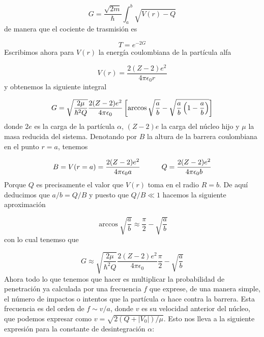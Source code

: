 \begin{equation}
    G = \frac{\sqrt{2m}}{\hbar} \int_a^b \sqrt{V(r)-Q}
\end{equation}
de manera que el cociente de trasmisión es

\begin{equation}
    T = e^{-2G}
\end{equation}
Escribimos ahora para $V(r)$ la energía coulombiana de la partícula alfa 

\begin{equation}
    V(r) = \frac{2(Z-2)e^2}{4\pi \epsilon_0 r}
\end{equation}
y obtenemos la siguiente integral

\begin{equation}
    G = \sqrt{\frac{2\mu}{\hbar^2Q}} \frac{2(Z-2)e^2}{4 \pi \epsilon_0} \left[ \arccos \sqrt{\frac{a}{b}}- \sqrt{\frac{a}{b}\left( 1-\frac{a}{b} \right)} \right]
\end{equation}
donde $2e$ es la carga de la partícula $\alpha$, $(Z-2)e$ la carga del núcleo hijo y $\mu$ la masa reducida del sistema. Denotando por $B$ la altura de la barrera coulombiana en el punto $r=a$, tenemos 

\begin{equation}
    B= V(r=a) = \frac{2(Z-2)e^2}{4\pi \epsilon_0 a} \quad \quad \quad Q=\frac{2(Z-2)e^2}{4 \pi \epsilon_0 b}
\end{equation}
Porque $Q$ es precisamente el valor que $V(r)$ toma en el radio $R=b$. De aquí deducimos que $a/b=Q/B$ y puesto que $Q/B\ll 1$ hacemos la siguiente aproximación 

\begin{equation}
    \arccos \sqrt{\frac{a}{b}} \approx \frac{\pi}{2} - \sqrt{\frac{a}{b}}
\end{equation}
con lo cual tenemso que 

\begin{equation}
    G \approx  \sqrt{\frac{2\mu}{\hbar^2Q}} \frac{2(Z-2)e^2}{4 \pi \epsilon_0}\frac{\pi}{2} - \sqrt{\frac{a}{b}}
\end{equation}
Ahora todo lo que tenemos que hacer es multiplicar la probabilidad de penetración ya calculada por una frecuencia $f$ que exprese, de una manera simple, el número de impactos o intentos que la partícula $\alpha$ hace contra la barrera. Esta frecuencia es del orden de $f \sim v/a$, donde $v$ es su velocidad anterior del núcleo, que podemos expresar como $v=\sqrt{2(Q+|V_0|)/\mu}$. Esto nos lleva a la siguiente expresión para la constante de desintegración $\alpha$:

